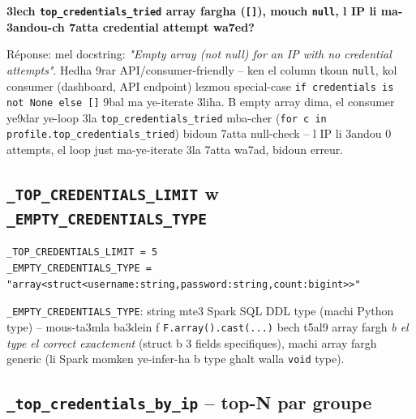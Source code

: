 \documentclass[11pt,a4paper]{report}
\DeclareRobustCommand{\code}[1]{\texttt{#1}}
\begin{document}
\begin{soual}
\textbf{3lech \code{top\_credentials\_tried} array fargha (\code{[]}),
mouch \code{null}, l IP li ma-3andou-ch 7atta credential attempt wa7ed?}

Réponse: mel docstring: \emph{"Empty array (not null) for an IP with no
credential attempts"}. Hedha 9rar API/consumer-friendly -- ken el column
tkoun \code{null}, kol consumer (dashboard, API endpoint) lezmou special-case
\code{if credentials is not None else []} 9bal ma ye-iterate 3liha. B
empty array dima, el consumer ye9dar ye-loop 3la \code{top\_credentials\_tried}
mba-cher (\code{for c in profile.top\_credentials\_tried}) bidoun 7atta
null-check -- l IP li 3andou 0 attempts, el loop just ma-ye-iterate 3la
7atta wa7ad, bidoun erreur.
\end{soual}

\subsection{\code{\_TOP\_CREDENTIALS\_LIMIT} w \code{\_EMPTY\_CREDENTIALS\_TYPE}}

\begin{lstlisting}[style=pystyle]
_TOP_CREDENTIALS_LIMIT = 5
_EMPTY_CREDENTIALS_TYPE = "array<struct<username:string,password:string,count:bigint>>"
\end{lstlisting}

\code{\_EMPTY\_CREDENTIALS\_TYPE}: string mte3 Spark SQL DDL type (machi
Python type) -- mous-ta3mla ba3dein f \code{F.array().cast(...)} bech
t5al9 array fargh \emph{b el type el correct exactement} (struct b 3
fields specifiques), machi array fargh generic (li Spark momken ye-infer-ha
b type ghalt walla \code{void} type).

\subsection{\code{\_top\_credentials\_by\_ip} -- top-N par groupe}
\end{document}
